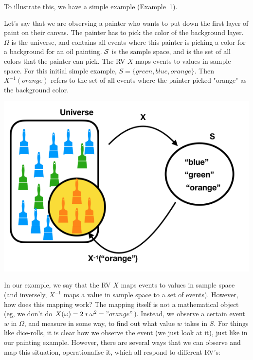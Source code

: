 To illustrate this, we have a simple example (Example~1).


\begin{example}
Let's say that we are observing a painter who wants to put down the first layer of paint on their canvas. The painter has to pick the color of the background layer. $\Omega$ is the universe, and contains all events where this painter is picking a color for a background for an oil painting. $\S$ is the sample space, and is the set of all colors that the painter can pick. The RV $X$ maps events to values in sample space. For this initial simple example, $S = \{green, blue, orange\}$. Then $X^{-1}(orange)$ refers to the set of all events where the painter picked "orange" as the background color.

\includegraphics[width=\linewidth]{images/rv2.png}
\end{example}

In our example, we say that the RV $X$ maps events to values in sample space (and inversely, $X^{-1}$ maps a value in sample space to a set of events). However, how does this mapping work? The mapping itself is not a mathematical object (eg, we don't do $X(\omega) = 2*\omega^2 = "orange"$). Instead, we observe a certain event $w$ in $\Omega$, and measure in some way, to find out what value $w$ takes in $S$. For things like dice-rolls, it is clear how we observe the event (we just look at it), just like in our painting example. However, there are several ways that we can observe and map this situation, operationalise it, which all respond to different RV's:

